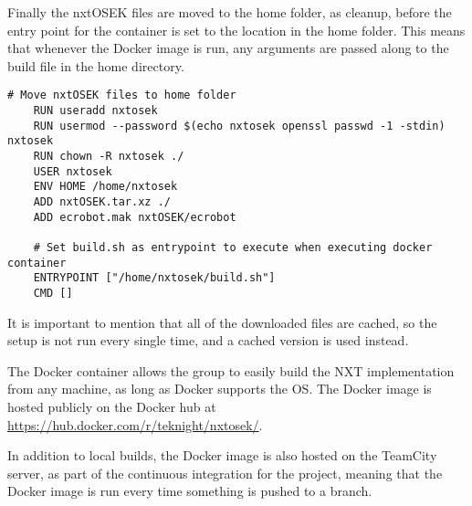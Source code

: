 Finally the nxtOSEK files are moved to the home folder, as cleanup, before the entry point for the container is set to the location in the home folder.
This means that whenever the Docker image is run, any arguments are passed along to the build file in the home directory.

\begin{lstlisting}[language=docker,label={lst:dockerimplementation4},caption={Reee}]   
    # Move nxtOSEK files to home folder
    RUN useradd nxtosek
    RUN usermod --password $(echo nxtosek openssl passwd -1 -stdin) nxtosek
    RUN chown -R nxtosek ./
    USER nxtosek
    ENV HOME /home/nxtosek
    ADD nxtOSEK.tar.xz ./
    ADD ecrobot.mak nxtOSEK/ecrobot
    
    # Set build.sh as entrypoint to execute when executing docker container
    ENTRYPOINT ["/home/nxtosek/build.sh"]
    CMD []    
\end{lstlisting}
It is important to mention that all of the downloaded files are cached, so the setup is not run every single time, and a cached version is used instead.

The Docker container allows the group to easily build the NXT implementation from any machine, as long as Docker supports the OS.
The Docker image is hosted publicly on the Docker hub at \url{https://hub.docker.com/r/teknight/nxtosek/}.

In addition to local builds, the Docker image is also hosted on the TeamCity server, as part of the continuous integration for the project, meaning that the Docker image is run every time something is pushed to a branch.


